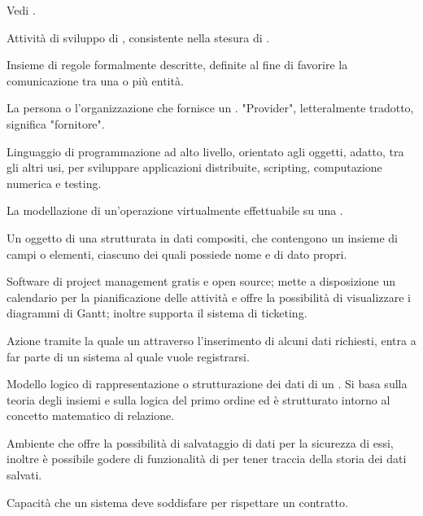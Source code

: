 {Vedi .}

{Attività di sviluppo di , consistente nella stesura di .}

{Insieme di regole formalmente descritte, definite al fine di favorire la comunicazione tra una o più entità.}

{La persona o l'organizzazione che fornisce un . "Provider", letteralmente tradotto, significa "fornitore".}

{Linguaggio di programmazione ad alto livello, orientato agli oggetti, adatto, tra gli altri usi, per sviluppare applicazioni distribuite, scripting, computazione numerica e testing.}



{La modellazione di un'operazione virtualmente effettuabile su una .}




{Un oggetto di una  strutturata in dati compositi, che contengono un insieme di campi o elementi, ciascuno dei quali possiede nome e  di dato propri.}

{Software di project management gratis e open source; mette a disposizione un calendario per la pianificazione delle attività e offre la possibilità di visualizzare i diagrammi di Gantt; inoltre supporta il sistema di ticketing.}

{Azione tramite la quale un  attraverso l'inserimento di alcuni dati richiesti, entra a far parte di un sistema al quale vuole registrarsi.}

{Modello logico di rappresentazione o strutturazione dei dati di un . Si basa sulla teoria degli insiemi e sulla logica del primo ordine ed è strutturato intorno al concetto matematico di relazione.}

{Ambiente che offre la possibilità di salvataggio di dati per la sicurezza di essi, inoltre è possibile godere di funzionalità di  per tener traccia della storia dei dati salvati.}

{Capacità che un sistema  deve soddisfare per rispettare un contratto.}

